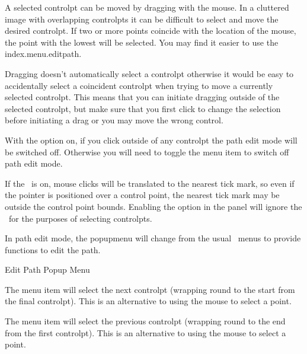 A selected \gls{controlpt} can be moved by dragging with the mouse.
In a cluttered image with overlapping \glspl{controlpt} it can be
difficult to select and move the desired \gls{controlpt}.
If two or more points coincide
with the location of the mouse, the point with the lowest
 will be selected.
You may find it easier to use the \gls{index.menu.editpath}.

Dragging doesn't automatically select a \gls{controlpt} otherwise it
would be easy to accidentally select a coincident \gls{controlpt}
when trying to move a currently selected \gls{controlpt}.
This means that you can initiate dragging outside of the selected
\gls*{controlpt}, but make sure that you
first click to change the selection before initiating a drag or you
may move the wrong control.

\begin{important}
With the  option on, if you
click outside of any \gls{controlpt} the path edit mode will be
switched off. Otherwise you will need to toggle the
 menu item to switch off path edit mode.
\end{important}

If the \gridlock\ is on, mouse clicks will be translated to the
nearest tick mark, so even if the pointer is positioned over a
control point, the nearest tick mark may be outside the control
point bounds. Enabling the  option in 
the  panel will ignore the \gridlock\ for the
purposes of selecting \glspl{controlpt}.


In path edit mode, the \gls{popupmenu} will change from the usual
\selectmode\ menus to provide functions to edit the \gls{path}.

 {}
 {Edit Path Popup Menu}


The  menu item will select the next \gls{controlpt}
(wrapping round to the start from the final \gls{controlpt}).
This is an alternative to using the mouse to select a point.


The  menu item will select the previous \gls{controlpt}
(wrapping round to the end from the first \gls{controlpt}).
This is an alternative to using the mouse to select a point.

